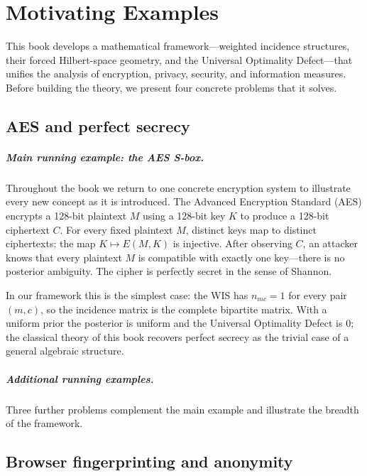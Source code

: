 \chapter[Motivating Examples]{Motivating Examples}\label{ch:sec:motivating-examples}

This book develops a mathematical framework---weighted incidence
structures, their forced Hilbert-space geometry, and the Universal
Optimality Defect---that unifies the analysis of encryption, privacy,
security, and information measures.  Before building the theory, we
present four concrete problems that it solves.

\section{AES and perfect secrecy}\label{ch:sec:aes-and-perfect-secrecy}

\paragraph{Main running example: the AES S-box.}
Throughout the book we return to one concrete encryption system to
illustrate every new concept as it is introduced.  The Advanced
Encryption Standard (AES) encrypts a 128-bit plaintext $M$ using a
128-bit key $K$ to produce a 128-bit ciphertext $C$.
For every fixed plaintext $M$, distinct keys map to distinct
ciphertexts: the map $K\mapsto E(M,K)$ is injective.  After observing
$C$, an attacker knows that every plaintext $M$ is compatible with
exactly one key---there is no posterior ambiguity.  The cipher is
perfectly secret in the sense of Shannon.

In our framework this is the simplest case: the WIS has $n_{mc}=1$ for
every pair $(m,c)$, so the incidence matrix is the complete bipartite
matrix.  With a uniform prior the posterior is uniform and the
Universal Optimality Defect is $0$; the classical theory of this book
recovers perfect secrecy as the trivial case of a general algebraic
structure.

\paragraph{Additional running examples.}
Three further problems complement the main example and illustrate the
breadth of the framework.

\section{Browser fingerprinting and anonymity}\label{ch:sec:browser-fingerprinting-and-anonymity}

